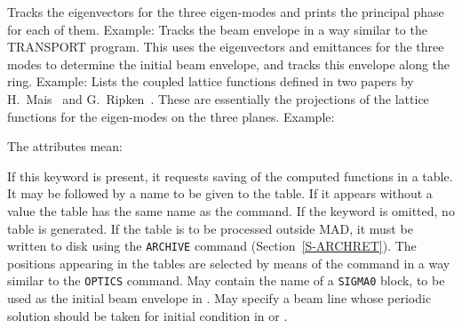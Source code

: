 \begin{mylist}
Tracks the eigenvectors for the three eigen-modes and prints the
principal phase for each of them.
Example:
Tracks the beam envelope in a way similar to the TRANSPORT program.
This uses the eigenvectors and emittances for the three modes to
determine the initial beam envelope,
and tracks this envelope along the ring.
Example:
Lists the coupled lattice functions defined in two papers by
H.~Mais~\cite{B-MAI82} and G.~Ripken~\cite{B-RIP70}.
These are essentially the projections of the lattice functions for the
eigen-modes on the three planes.
Example:
\end{mylist}
 
The attributes mean:
 
\begin{mylist}
If this keyword is present,
it requests saving of the computed functions in a table.
It may be followed by a name to be given to the table.
If it appears without a value the table has the same name as the
command.
If the  keyword is omitted, no table is generated.
If the table is to be processed outside MAD, it must be written to
disk using the {\tt ARCHIVE} command (Section~\ref{S-ARCHRET}).
The positions appearing in the tables are selected by means of the
command
in a way similar to the {\tt OPTICS} command.
May contain the name of a {\tt SIGMA0} block,
to be used as the initial beam envelope in .
May specify a beam line whose periodic solution should be taken for
initial condition in  or .
\end{mylist}
 
